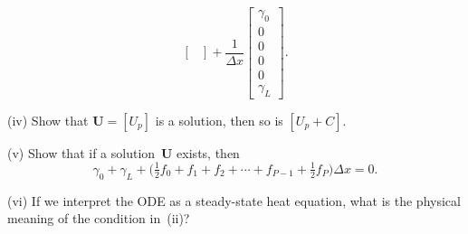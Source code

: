 \begin{Exercises}
\begin{description}
\[\begin{bmatrix}
\end{bmatrix}
+\frac{1}{\Delta x}
\begin{bmatrix}\gamma_0\\ 0\\ 0\\ 0\\ 0\\ \gamma_L\end{bmatrix}.
\]
\item{(iv)} Show that $\boldsymbol{U}=[U_p]$ is a solution, then so is 
$[U_p+C]$.
\item{(v)} Show that if a solution~$\boldsymbol{U}$ exists, then
\[
\gamma_0+\gamma_L+\bigl(\tfrac12f_0+f_1+f_2+\cdots+f_{P-1}+\tfrac12f_P\bigr)
\Delta x=0.
\]
\item{(vi)} If we interpret the ODE as a steady-state heat equation, what is 
the physical meaning of the condition in~(ii)?
\end{description}

\end{Exercises}